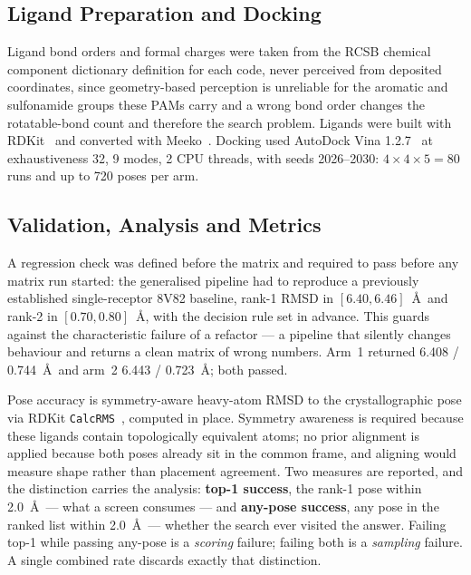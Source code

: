 \documentclass[sigconf]{acmart}
\begin{document}
\subsection{Ligand Preparation and Docking}

Ligand bond orders and formal charges were taken from the RCSB chemical component
dictionary definition for each code, never perceived from deposited coordinates,
since geometry-based perception is unreliable for the aromatic and sulfonamide
groups these PAMs carry and a wrong bond order changes the rotatable-bond count
and therefore the search problem. Ligands were built with RDKit~\cite{rdkit} and
converted with Meeko~\cite{meeko}. Docking used AutoDock Vina
1.2.7~\cite{eberhardt2021autodock,trott2010autodock} at exhaustiveness 32, 9
modes, 2 CPU threads, with seeds 2026--2030: $4 \times 4 \times 5 = 80$ runs and
up to 720 poses per arm.

\subsection{Validation, Analysis and Metrics}

A regression check was defined before the matrix and required to pass before any
matrix run started: the generalised pipeline had to reproduce a previously
established single-receptor 8V82 baseline, rank-1 RMSD in $[6.40, 6.46]$~\AA\ and
rank-2 in $[0.70, 0.80]$~\AA, with the decision rule set in advance. This guards
against the characteristic failure of a refactor --- a pipeline that silently
changes behaviour and returns a clean matrix of wrong numbers. Arm~1 returned
6.408 / 0.744~\AA\ and arm~2 6.443 / 0.723~\AA; both passed.

Pose accuracy is symmetry-aware heavy-atom RMSD to the crystallographic pose via
RDKit \texttt{CalcRMS}~\cite{rdkit}, computed in place. Symmetry awareness is
required because these ligands contain topologically equivalent atoms; no prior
alignment is applied because both poses already sit in the common frame, and
aligning would measure shape rather than placement agreement. Two measures are
reported, and the distinction carries the analysis: \textbf{top-1 success}, the
rank-1 pose within 2.0~\AA\ --- what a screen consumes --- and \textbf{any-pose
success}, any pose in the ranked list within 2.0~\AA\ --- whether the search ever
visited the answer. Failing top-1 while passing any-pose is a \emph{scoring}
failure; failing both is a \emph{sampling} failure. A single combined rate
discards exactly that distinction.
\end{document}
